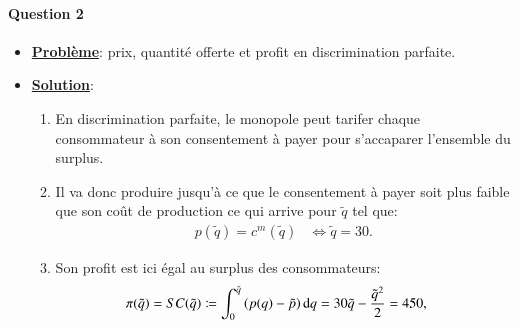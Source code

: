     \begin{frame}
      [allowframebreaks]{\insertsection}
      \framesubtitle{Question 2\\}
      \begin{itemize}
    \item \textbf{\underline{Problème}}:  prix, quantité offerte et profit en discrimination parfaite.
        \item \textbf{\underline{Solution}}: 
      \begin{enumerate}[$\cdot$]
       \item En discrimination parfaite, le monopole peut tarifer
        chaque consommateur à son consentement à payer pour s’accaparer l’ensemble du surplus. 
        \item Il va donc produire jusqu’à ce que le consentement à payer soit plus faible que son coût de production 
        ce qui arrive pour $\tilde{q}$ tel que:
        \begin{align*}
          p(\tilde{q}) = c^m(\tilde{q}) &\Leftrightarrow \tilde{q} = 30.
        \end{align*}
        \item Son profit est ici égal au surplus des consommateurs:
        \begin{align*}
          \pi(\tilde{q}) &= SC(\tilde{q}) \coloneqq\int_0^{\tilde{q}}\left({p(q) - \tilde{p}}\right)\mathop{}\!\mathrm{d} q =30\tilde{q} - \frac{\tilde{q}^{2}}{2}  = 450,
         \end{align*}
      \end{enumerate}
    \end{itemize}
      \end{frame}

